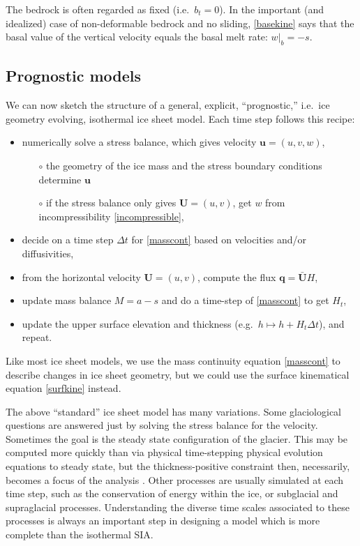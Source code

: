 \documentclass[letterpaper,final,12pt,reqno]{amsart}
\newcommand{\bq}{\mathbf{q}}
\newcommand{\bU}{\mathbf{U}}
\begin{document}
The bedrock is often regarded as fixed (i.e.~$b_t=0$).  In the important (and idealized) case of non-deformable bedrock and no sliding, \eqref{basekine} says that the basal value of the vertical velocity equals the basal melt rate: $w\big|_b=-s$.

\subsection*{Prognostic models}  We can now sketch the structure of a general, explicit, ``prognostic,'' i.e.~ice geometry evolving, isothermal ice sheet model.  Each time step follows this recipe:
  \begin{itemize}
  \item numerically solve a stress balance, which gives velocity $\mathbf{u}=(u,v,w)$,
    \begin{itemize}
    \item[$\circ$] the geometry of the ice mass and the stress boundary conditions determine $\mathbf{u}$
    \item[$\circ$] if the stress balance only gives $\mathbf{U}=(u,v)$, get $w$ from incompressibility \eqref{incompressible},
    \end{itemize}
  \item decide on a time step $\Delta t$ for \eqref{masscont} based on velocities and/or diffusivities,
  \item from the horizontal velocity $\mathbf{U}=(u,v)$, compute the flux $\bq = \bar{\bU} H$,
  \item update mass balance $M=a-s$ and do a time-step of \eqref{masscont} to get $H_t$,
  \item update the upper surface elevation and thickness (e.g.~$h \mapsto h + H_t \Delta t$), and repeat.
  \end{itemize}
Like most ice sheet models, we use the mass continuity equation \eqref{masscont} to describe changes in ice sheet geometry, but we could use the surface kinematical equation \eqref{surfkine} instead.

The above ``standard'' ice sheet model has many variations.  Some glaciological questions are answered just by solving the stress balance for the velocity.  Sometimes the goal is the steady state configuration of the glacier.  This may be computed more quickly than via physical time-stepping physical evolution equations to steady state, but the thickness-positive constraint then, necessarily, becomes a focus of the analysis \cite{Bueler2016,JouvetBueler2012}.  Other processes are usually simulated at each time step, such as the conservation of energy within the ice, or subglacial and supraglacial processes.  Understanding the diverse time scales associated to these processes is always an important step in designing a model which is more complete than the isothermal SIA.
\end{document}
